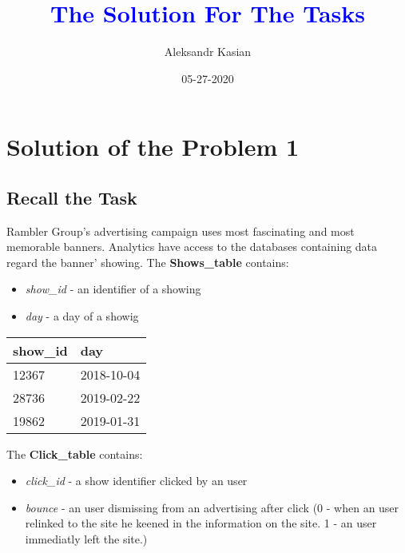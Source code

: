 \documentclass[14pt, a4paper]{extarticle}
\title{\textcolor{blue}{The Solution For The Tasks}}
\date{05-27-2020}
\author{Aleksandr Kasian}
\begin{document}
\begin{titlepage}
	\maketitle
\end{titlepage}
\newpage

\tableofcontents

\newpage

\section*{Solution of the Problem 1}
\subsection*{Recall the Task}

Rambler Group's advertising campaign uses most fascinating and most memorable banners.
Analytics have access to the databases containing data regard the banner' showing.
The \textbf{Shows\_table} contains:
\begin{itemize}
	\item \emph{show\_id} - an identifier of a showing 
	\item \emph{day} - a day of a showig
\end{itemize}

\begin{table}[h]
	\begin{tabular}{|l|l|}
	\hline
	show\_id & day        \\ \hline
	12367    & 2018-10-04 \\ \hline
	28736    & 2019-02-22 \\ \hline
	19862    & 2019-01-31 \\ \hline
	\end{tabular}
\end{table}

\noindent
The \textbf{Click\_table} contains:
\begin{itemize}
	\item \emph{click\_id} - a show identifier clicked by an user
	\item \emph{bounce} - an user dismissing from an advertising after click (0 - when an user relinked to the site 
	he keened in the information on the site. 1 - an user immediatly left the site.)
\end{itemize}
\end{document}
